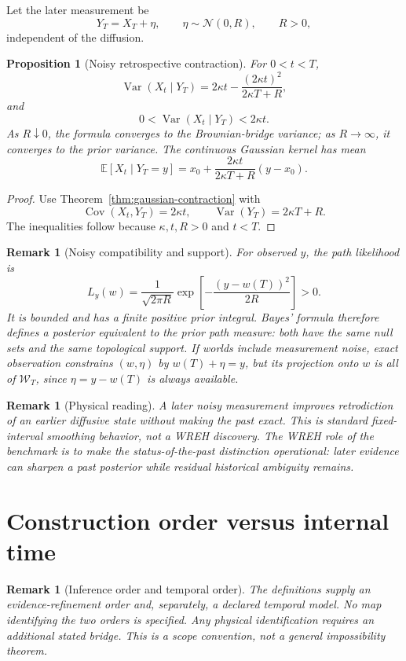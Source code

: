 \documentclass[11pt]{article}
\newtheorem{proposition}[definition]{Proposition}
\newtheorem{remark}[definition]{Remark}
\newcommand{\Wcal}{\mathcal W}
\begin{document}
Let the later measurement be
\[
Y_T=X_T+\eta,
\qquad
\eta\sim\mathcal N(0,R),
\qquad
R>0,
\]
independent of the diffusion.

\begin{proposition}[Noisy retrospective contraction]
\label{prop:noisy-contraction}
For \(0<t<T\),
\[
\operatorname{Var}(X_t\mid Y_T)
=
2\kappa t-\frac{(2\kappa t)^2}{2\kappa T+R},
\]
and
\[
0<
\operatorname{Var}(X_t\mid Y_T)
<
2\kappa t.
\]
As \(R\downarrow0\), the formula converges to the Brownian-bridge
variance; as $R\to\infty$, it converges to the prior variance.
The continuous Gaussian kernel has mean
\[
\mathbb E[X_t\mid Y_T=y]
=x_0+\frac{2\kappa t}{2\kappa T+R}(y-x_0).
\]
\end{proposition}

\begin{proof}
Use Theorem~\ref{thm:gaussian-contraction} with
\[
\operatorname{Cov}(X_t,Y_T)=2\kappa t,
\qquad
\operatorname{Var}(Y_T)=2\kappa T+R.
\]
The inequalities follow because \(\kappa,t,R>0\) and \(t<T\).
\end{proof}

\begin{remark}[Noisy compatibility and support]
For observed $y$, the path likelihood is
\[
L_y(w)=\frac{1}{\sqrt{2\pi R}}
\exp\!\left[-\frac{(y-w(T))^2}{2R}\right]>0.
\]
It is bounded and has a finite positive prior integral. Bayes' formula
therefore defines a posterior equivalent to the prior path measure:
both have the same null sets and the same topological support.
If worlds include measurement noise, exact observation constrains
$(w,\eta)$ by $w(T)+\eta=y$, but its projection onto $w$ is all of
$\Wcal_T$, since $\eta=y-w(T)$ is always available.
\end{remark}

\begin{remark}[Physical reading]
A later noisy measurement improves retrodiction of an earlier diffusive state without making
the past exact. This is standard fixed-interval smoothing behavior, not a WREH discovery.
The WREH role of the benchmark is to make the status-of-the-past distinction operational:
later evidence can sharpen a past posterior while residual historical ambiguity remains.
\end{remark}

\section{Construction order versus internal time}
\begin{remark}[Inference order and temporal order]
The definitions supply an evidence-refinement order and, separately,
a declared temporal model. No map identifying the two orders is
specified. Any physical identification requires an additional stated
bridge. This is a scope convention, not a general impossibility theorem.
\end{remark}
\end{document}
